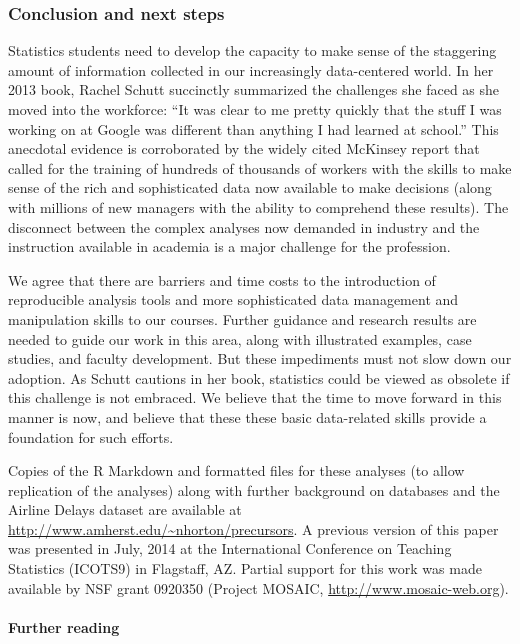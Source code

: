 \documentclass[]{article}
\begin{document}
\subsubsection{Conclusion and next
steps}\label{conclusion-and-next-steps}

Statistics students need to develop the capacity to make sense of the
staggering amount of information collected in our increasingly
data-centered world. In her 2013 book, Rachel Schutt succinctly
summarized the challenges she faced as she moved into the workforce:
``It was clear to me pretty quickly that the stuff I was working on at
Google was different than anything I had learned at school.'' This
anecdotal evidence is corroborated by the widely cited McKinsey report
that called for the training of hundreds of thousands of workers with
the skills to make sense of the rich and sophisticated data now
available to make decisions (along with millions of new managers with
the ability to comprehend these results). The disconnect between the
complex analyses now demanded in industry and the instruction available
in academia is a major challenge for the profession.

We agree that there are barriers and time costs to the introduction of
reproducible analysis tools and more sophisticated data management and
manipulation skills to our courses. Further guidance and research
results are needed to guide our work in this area, along with
illustrated examples, case studies, and faculty development. But these
impediments must not slow down our adoption. As Schutt cautions in her
book, statistics could be viewed as obsolete if this challenge is not
embraced. We believe that the time to move forward in this manner is
now, and believe that these these basic data-related skills provide a
foundation for such efforts.

Copies of the R Markdown and formatted files for these analyses (to
allow replication of the analyses) along with further background on
databases and the Airline Delays dataset are available at
\url{http://www.amherst.edu/~nhorton/precursors}. A previous version of
this paper was presented in July, 2014 at the International Conference
on Teaching Statistics (ICOTS9) in Flagstaff, AZ.  Partial support for this work was
made available by NSF grant 0920350 (Project MOSAIC, \url{http://www.mosaic-web.org}).

\paragraph{Further reading}\label{further-reading}
\end{document}

